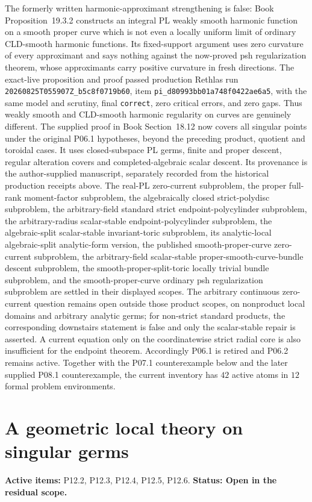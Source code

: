 \documentclass[11pt,a4paper]{article}
\theoremstyle{definition}
\theoremstyle{remark}
\begin{document}
The formerly written harmonic-approximant strengthening is false:
Book Proposition~19.3.2 constructs an integral
PL weakly smooth harmonic function on a smooth proper curve which is not even
a locally uniform limit of ordinary CLD-smooth harmonic functions.  Its
fixed-support argument uses zero curvature of every approximant and says
nothing against the now-proved psh regularization theorem, whose approximants
carry positive curvature in fresh directions.
The exact-live proposition and proof passed production Rethlas run
\nolinkurl{20260825T055907Z_b5c8f0719b60}, item
\nolinkurl{pi_d80993bb01a748f0422ae6a5}, with the same model and scrutiny,
final \texttt{correct}, zero critical errors, and zero gaps.  Thus weakly
smooth and CLD-smooth harmonic regularity on curves are genuinely different.
The supplied proof in Book Section~18.12 now covers all singular
points under the original P06.1 hypotheses, beyond the preceding product,
quotient and toroidal cases. It uses closed-subspace PL germs, finite and
proper descent, regular alteration covers and completed-algebraic scalar
descent. Its provenance is the author-supplied manuscript, separately
recorded from the historical production receipts above.
The real-PL zero-current subproblem, the proper
full-rank moment-factor subproblem, the algebraically closed strict-polydisc
subproblem, the arbitrary-field standard strict endpoint-polycylinder
subproblem,
the arbitrary-radius scalar-stable endpoint-polycylinder subproblem,
the algebraic-split scalar-stable invariant-toric subproblem,
its analytic-local algebraic-split analytic-form version,
the published smooth-proper-curve zero-current subproblem,
the arbitrary-field scalar-stable proper-smooth-curve-bundle descent
subproblem,
the smooth-proper-split-toric locally trivial bundle subproblem, and the
smooth-proper-curve ordinary psh
regularization subproblem are settled in their displayed scopes.  The
arbitrary continuous zero-current question remains open outside those
product scopes, on nonproduct local domains and arbitrary analytic germs;
for non-strict standard products, the corresponding downstairs statement is
false and only the scalar-stable repair is asserted.  A current equation only
on the coordinatewise strict radial core is also insufficient for the
endpoint theorem.
Accordingly P06.1 is retired and P06.2 remains active. Together with the
P07.1 counterexample below and the later supplied P08.1 counterexample, the
current inventory has \(42\) active atoms in \(12\) formal problem environments.

\clearpage\section{A geometric local theory on singular germs}
\label{family:6}
\noindent\textbf{Active items:} P12.2, P12.3, P12.4, P12.5, P12.6. \textbf{Status: Open in the residual scope.}
\end{document}
